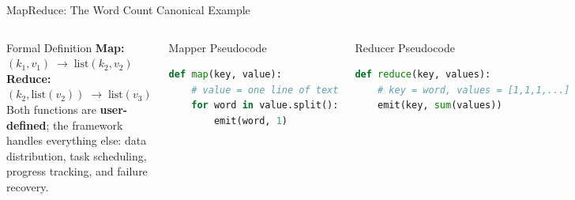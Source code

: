\documentclass[aspectratio=169,10pt]{beamer}
\begin{document}
\begin{frame}[fragile]{MapReduce: The Word Count Canonical Example}
\begin{columns}[T]
      \begin{alertblock}{Formal Definition} 
        \textbf{Map:} $(k_1, v_1) \;\to\; \text{list}(k_2, v_2)$\\
        \textbf{Reduce:} $(k_2, \text{list}(v_2)) \;\to\; \text{list}(v_3)$\\[4pt]
        Both functions are \textbf{user-defined}; the framework handles everything else: data distribution, task scheduling, progress tracking, and failure recovery.
      \end{alertblock}
      \vspace{4pt}
      \begin{block}{Mapper Pseudocode}
        \begin{lstlisting}[language=Python]
def map(key, value):
    # value = one line of text
    for word in value.split():
        emit(word, 1)
        \end{lstlisting}
      \end{block}
      \begin{block}{Reducer Pseudocode}
        \begin{lstlisting}[language=Python]
def reduce(key, values):
    # key = word, values = [1,1,1,...]
    emit(key, sum(values))
        \end{lstlisting}
      \end{block}
  \end{columns}
\end{frame}
\end{document}
